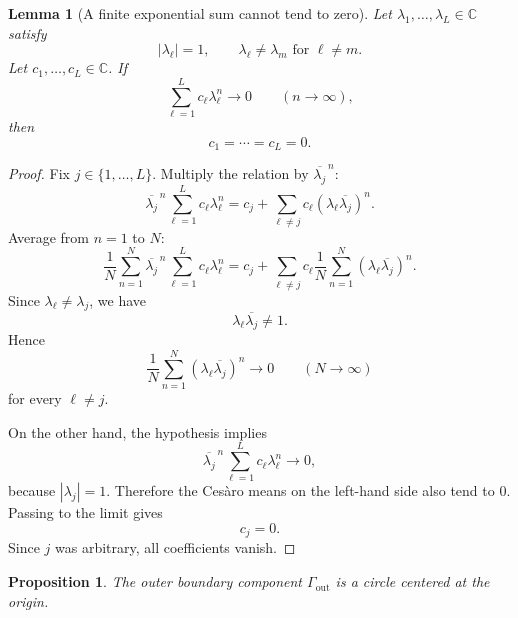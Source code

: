 \documentclass[11pt]{amsart}
\newtheorem{proposition}[theorem]{Proposition}
\newtheorem{lemma}[theorem]{Lemma}
\theoremstyle{remark}
\newcommand{\C}{\mathbb C}
\newcommand{\1}{\mathbf 1}
\begin{document}
\begin{lemma}[A finite exponential sum cannot tend to zero]\label{lem:exp-sum-detailed}
Let $\lambda_1,\dots,\lambda_L\in\C$ satisfy
\[
|\lambda_\ell|=1,
\qquad
\lambda_\ell\neq \lambda_m \text{ for }\ell\neq m.
\]
Let $c_1,\dots,c_L\in\C$. If
\[
\sum_{\ell=1}^L c_\ell \lambda_\ell^n \longrightarrow 0
\qquad (n\to\infty),
\]
then
\[
c_1=\cdots=c_L=0.
\]
\end{lemma}

\begin{proof}
Fix $j\in\{1,\dots,L\}$. Multiply the relation by $\overline{\lambda_j}^{\,n}$:
\[
\overline{\lambda_j}^{\,n}\sum_{\ell=1}^L c_\ell\lambda_\ell^n
=
c_j+\sum_{\ell\neq j} c_\ell (\lambda_\ell\overline{\lambda_j})^n.
\]
Average from $n=1$ to $N$:
\[
\frac1N\sum_{n=1}^N \overline{\lambda_j}^{\,n}\sum_{\ell=1}^L c_\ell\lambda_\ell^n
=
c_j
+
\sum_{\ell\neq j} c_\ell
\frac1N\sum_{n=1}^N (\lambda_\ell\overline{\lambda_j})^n.
\]
Since $\lambda_\ell\neq \lambda_j$, we have
\[
\lambda_\ell\overline{\lambda_j}\neq 1.
\]
Hence
\[
\frac1N\sum_{n=1}^N (\lambda_\ell\overline{\lambda_j})^n \to 0
\qquad (N\to\infty)
\]
for every $\ell\neq j$.

On the other hand, the hypothesis implies
\[
\overline{\lambda_j}^{\,n}\sum_{\ell=1}^L c_\ell\lambda_\ell^n \to 0,
\]
because $|\lambda_j|=1$. Therefore the Ces\`aro means on the left-hand side also tend to $0$. Passing to the limit gives
\[
c_j=0.
\]
Since $j$ was arbitrary, all coefficients vanish.
\end{proof}

\begin{proposition}\label{prop:outer-circle-detailed}
The outer boundary component $\Gamma_{\mathrm{out}}$ is a circle centered at the origin.
\end{proposition}
\end{document}
